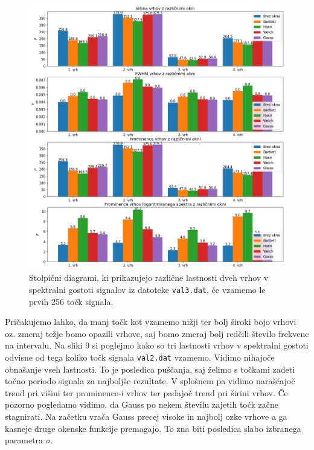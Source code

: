 \documentclass[slovene,11pt,a4paper]{article}
\begin{document}
\newpage

\begin{figure}[h!]
\centering
\includegraphics[width=15cm]{slika8.png}
\caption{Stolpični diagrami, ki prikazujejo različne lastnosti dveh vrhov v spektralni gostoti signalov iz datoteke \texttt{val3.dat}, če vzamemo le prvih 256 točk signala.}
\end{figure}

Pričakujemo lahko, da manj točk kot vzamemo nižji ter bolj široki bojo vrhovi oz. zmeraj težje bomo opazili vrhove, saj bomo zmeraj bolj redčili število frekvenc na intervalu. Na sliki 9 si poglejmo kako so tri lastnosti vrhov v spektralni gostoti odvisne od tega koliko točk signala \texttt{val2.dat} vzamemo. Vidimo nihajoče obnašanje vseh lastnosti. To je posledica puščanja, saj želimo s točkami zadeti točno periodo signala za najboljše rezultate. V splošnem pa vidimo naraščajoč trend pri višini ter prominence-i vrhov ter padajoč trend pri širini vrhov. Če pozorno pogledamo vidimo, da Gauss po nekem številu zajetih točk začne stagnirati. Na začetku vrača Gauss precej visoke in najbolj ozke vrhove a ga kasneje druge okenske funkcije premagajo. To zna biti posledica slabo izbranega parametra $\sigma$.

\newpage
\end{document}
